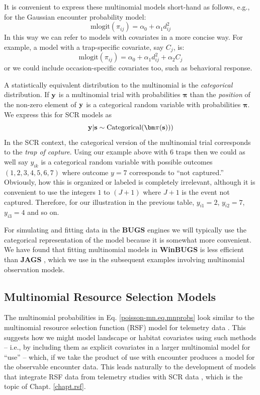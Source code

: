 It is convenient to express these multinomial models short-hand as
follows, e.g., for the Gaussian encounter probability model:
\[
\mbox{mlogit}( \pi_{ij} ) = \alpha_{0} + \alpha_{1} d_{ij}^{2}
\]
In this way we can refer to models with covariates in a more concise
way. For example, a model with a trap-specific covariate, say $C_{j}$, is:
\[
\mbox{mlogit}( \pi_{ij} ) = \alpha_{0} + \alpha_{1} d_{ij}^{2} + \alpha_{2} C_{j}
\]
or we could include occasion-specific covariates too, such as
behavioral response.

A statistically equivalent distribution to the multinomial is the {\it
  categorical} distribution.  If ${\bf y}$ is a multinomial trial with
probabilities ${\bm \pi}$ than the {\it position} of the non-zero
element of ${\bf y}$ is a categorical random variable with
probabilities ${\bm \pi}$.  We express this for SCR models as
\[
{\bf y}|{\bf s} \sim \mbox{Categorical}( {\bm \pi}({\bf s})) )
\]
In the SCR context, the categorical version of the multinomial trial
corresponds to the {\it trap of capture}.  Using our example above
with 6 traps then we could as well say $y_{ik}$ is a categorical
random variable with possible outcomes $(1,2,3,4,5,6,7)$ where outcome
$y=7$ corresponds to ``not captured.'' Obviously, how this is
organized or labeled is completely irrelevant, although it is
convenient to use the integers $1$ to $(J+1)$ where $J+1$ is the event
not captured.  Therefore, for our illustration in the previous table,
$y_{i1} = 2$, $y_{i2} = 7$, $y_{i3} = 4$ and so on.

For simulating and fitting data in the {\bf BUGS} engines we will
typically use the categorical representation of the model because it
is somewhat more convenient.  We have found that fitting multinomial
models in {\bf WinBUGS} is less efficient than {\bf JAGS}
\citep{royle_converse:2013}, which we use in the subsequent examples
involving multinomial observation models.


\subsection{Multinomial  Resource Selection Models}

The multinomial probabilities in Eq. \ref{poisson-mn.eq.mnprobs}
look similar to the
multinomial resource selection function (RSF) model for telemetry data
\citep{manly_etal:2002, lele_keim:2006}.  This suggests how we might
model landscape or habitat covariates using such methods -- i.e., by
including them as explicit covariates in a larger multinomial model
for ``use'' -- which, if we take the product of use with encounter
produces a model for the observable encounter data. This
leads naturally to the development of models that integrate RSF data
from telemetry studies with SCR data
\citep{royle_etal:2012mee}, 
which is the topic of  Chapt. \ref{chapt.rsf}.



